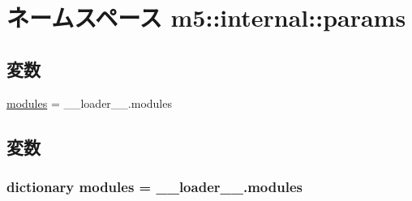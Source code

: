 \hypertarget{namespacem5_1_1internal_1_1params}{
\section{ネームスペース m5::internal::params}
\label{namespacem5_1_1internal_1_1params}
}
\subsection*{変数}
\begin{DoxyCompactItemize}
\item 
\hyperlink{namespacem5_1_1internal_1_1params_a0747857286993d5b56864aa1248e7bf3}{modules} = \_\-\_\-loader\_\-\_\-.modules
\end{DoxyCompactItemize}


\subsection{変数}
\hypertarget{namespacem5_1_1internal_1_1params_a0747857286993d5b56864aa1248e7bf3}{
\subsubsection[{modules}]{\setlength{\rightskip}{0pt plus 5cm}dictionary {\bf modules} = \_\-\_\-loader\_\-\_\-.modules}}
\label{namespacem5_1_1internal_1_1params_a0747857286993d5b56864aa1248e7bf3}
